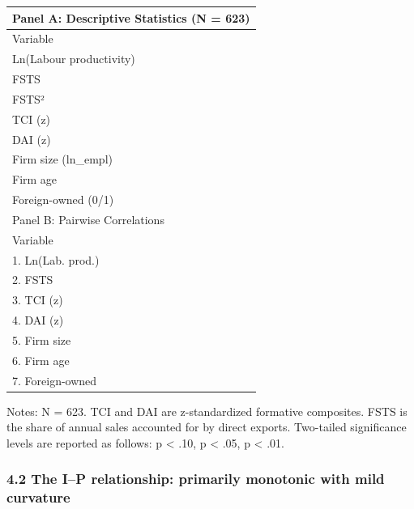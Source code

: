 \documentclass[
  12pt,a4paper]{article}
\begin{document}
\begin{longtable}[]{@{}l@{}}
\toprule\noalign{}
Panel A: Descriptive Statistics (N = 623) \\
\midrule\noalign{}
\endhead
\bottomrule\noalign{}
\endlastfoot
Variable \\
Ln(Labour productivity) \\
FSTS \\
FSTS² \\
TCI (z) \\
DAI (z) \\
Firm size (ln\_empl) \\
Firm age \\
Foreign-owned (0/1) \\
Panel B: Pairwise Correlations \\
Variable \\
1. Ln(Lab. prod.) \\
2. FSTS \\
3. TCI (z) \\
4. DAI (z) \\
5. Firm size \\
6. Firm age \\
7. Foreign-owned \\
\end{longtable}

Notes: N = 623. TCI and DAI are z-standardized formative composites.
FSTS is the share of annual sales accounted for by direct exports.
Two-tailed significance levels are reported as follows: p \textless{}
.10, p \textless{} .05, p \textless{} .01.

\hypertarget{the-ip-relationship-primarily-monotonic-with-mild-curvature}{%
\subsubsection{4.2 The I--P relationship: primarily monotonic with mild
curvature}\label{the-ip-relationship-primarily-monotonic-with-mild-curvature}}
\end{document}
